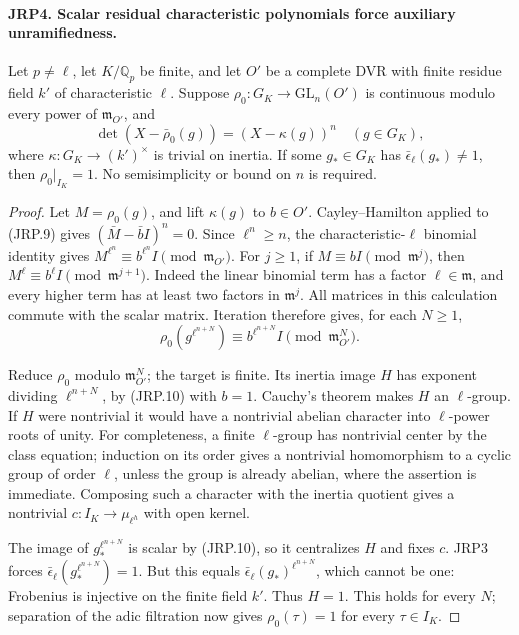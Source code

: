 \paragraph{JRP4. Scalar residual characteristic polynomials force auxiliary unramifiedness.}
\label{claim:JRP4}
Let \(p\ne\ell\), let \(K/\mathbb Q_p\) be finite, and let
\(O'\) be a complete DVR with finite residue field \(k'\) of
characteristic \(\ell\).  Suppose
\(\rho_0:G_K\to\mathrm{GL}_n(O')\) is continuous modulo every
power of \(\mathfrak m_{O'}\), and
\[
 \det(X-\bar\rho_0(g))=(X-\kappa(g))^n
                  \quad(g\in G_K),
 \tag{JRP.9}
\]
where \(\kappa:G_K\to(k')^\times\) is trivial on inertia.
If some \(g_*\in G_K\) has
\(\bar\epsilon_\ell(g_*)\ne1\), then
\(\rho_0|_{I_K}=1\).  No semisimplicity or bound on \(n\)
is required.
\begin{proof}
Let \(M=\rho_0(g)\), and lift \(\kappa(g)\) to \(b\in O'\).
Cayley--Hamilton applied to (JRP.9) gives
\((\bar M-\bar b I)^n=0\).  Since \(\ell^n\ge n\),
the characteristic-\(\ell\) binomial identity gives
\(M^{\ell^n}\equiv b^{\ell^n}I\pmod{\mathfrak m_{O'}}\).
For \(j\ge1\), if \(M\equiv bI\pmod{\mathfrak m^j}\),
then
\(M^\ell\equiv b^\ell I\pmod{\mathfrak m^{j+1}}\).
Indeed the linear binomial term has a factor \(\ell\in\mathfrak m\),
and every higher term has at least two factors in \(\mathfrak m^j\).
All matrices in this calculation commute with the scalar matrix.
Iteration therefore gives, for each \(N\ge1\),
\[
 \rho_0(g^{\ell^{n+N}})
       \equiv b^{\ell^{n+N}}I\pmod{\mathfrak m_{O'}^N}.
 \tag{JRP.10}
\]

Reduce \(\rho_0\) modulo \(\mathfrak m_{O'}^N\); the target
is finite.  Its inertia image \(H\) has exponent dividing
\(\ell^{n+N}\), by (JRP.10) with \(b=1\).
Cauchy's theorem makes \(H\) an \(\ell\)-group.  If \(H\)
were nontrivial it would have a nontrivial abelian character into
\(\ell\)-power roots of unity.  For completeness, a finite
\(\ell\)-group has nontrivial center by the class equation;
induction on its order gives a nontrivial homomorphism to a cyclic
group of order \(\ell\), unless the group is already abelian,
where the assertion is immediate.  Composing such a character with
the inertia quotient gives a nontrivial
\(c:I_K\to\mu_{\ell^h}\) with open kernel.

The image of \(g_*^{\ell^{n+N}}\) is scalar by (JRP.10), so
it centralizes \(H\) and fixes \(c\).  JRP3 forces
\(\bar\epsilon_\ell(g_*^{\ell^{n+N}})=1\).
But this equals
\(\bar\epsilon_\ell(g_*)^{\ell^{n+N}}\), which cannot be one:
Frobenius is injective on the finite field \(k'\).
Thus \(H=1\).  This holds for every \(N\); separation of the
adic filtration now gives \(\rho_0(\tau)=1\) for every
\(\tau\in I_K\).
\end{proof}

